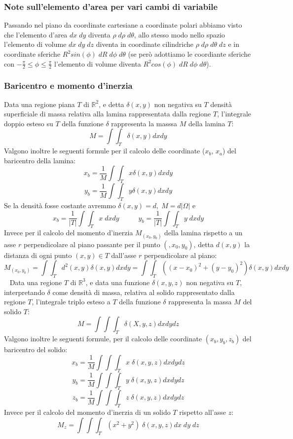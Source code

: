 \subsubsection{Note sull'elemento d'area per vari cambi di variabile}
Passando nel piano da coordinate cartesiane a coordinate polari abbiamo visto che l'elemento d'area $dx \; dy$ diventa $\rho \; d \rho \;d \theta$, allo stesso modo nello spazio l'elemento di volume $dx \; dy \; dz$ diventa in coordinate cilindriche $\rho\; d \rho\; d \theta \; dz$ e in coordinate sferiche $R^2 sin(\phi)\; dR \;d \phi \;d \theta$ (se però adottiamo le coordiante sferiche con $-\frac{\pi}{2} \leq \phi \leq \frac{\pi}{2}$ l'elemento di volume diventa $R^2 cos(\phi) \;dR \;d \phi \;d \theta$).
\subsubsection{Baricentro e momento d'inerzia}
Data una regione piana $T$ di $\mathbb{R}^2$, e detta $\delta (x,y)$ non negativa su $T$ densità superficiale di massa relativa alla lamina rappresentata dalla regione $T$, l'integrale doppio esteso su $T$ della funzione $\delta$ rappresenta la masssa $M$ della lamina $T$:
\[
    M = \int \int_{T} \delta(x,y) dx dy
\]
Valgono inoltre le seguenti formule per il calcolo delle coordinate ($x_b$, $x_a$) del baricentro della lamina:
\[
    x_b = \frac{1}{M}\int \int_{T} x \delta(x,y)dxdy
\]
\[
    y_b= \frac{1}{M} \int \int_{T} y \delta(x,y)dxdy
\]
Se la densità fosse costante avremmo $\delta(x,y) = d, \; M = d|\Omega|$ e 
\[
    x_b = \frac{1}{|T|} \int \int_{T} x \;dxdy \;\;\;\;\;\;\;\;\;\; y_b =\frac{1}{|T|} \int \int_{T} y \;dxdy
\]
Invece per il calcolo del momento d'inerzia $M_{(x_0, y_0)}$ della lamina rispetto a un asse $r$ perpendicolare al piano passante per il punto $(,x_0, y_0)$, detta $d(x,y)$ la distanza di ogni punto $(x,y) \in T$ dall'asse $r$ perpendicolare al piano:
\[
    M_{(x_0, y_0)} =\int \int_{T}d^2(x,y) \delta(x,y) dxdy = \int \int_{T}((x-x_0)^2 + (y-y_0)^2) \delta(x,y) dxdy
\]
\ \newline
\newline
Data una regione $T$ di $\mathbb{R}^3$, e data una funzione $\delta(x,y,z)$ non negativa su $T$, interpretando $\delta$ come densità di massa, relativa al solido rappresentato dalla regione $T$, l'integrale triplo esteso a $T$ della funzione $\delta$ rappresenta la massa $M$ del solido $T$:
\[
    M = \int \int \int_{T} \delta(X,y,z)dx dy dz
\]
Valgono inoltre le seguenti formule, per il calcolo delle coordinate $(x_b, y_b, z_b)$ del baricentro del solido:
\[
    x_b = \frac{1}{M} \int \int \int_{T} x \; \delta(x,y,z) dx dy dz
\]
\[
    y_b = \frac{1}{M} \int \int \int_{T} y \; \delta(x,y,z)dx dy dz
\]
\[
    z_b = \frac{1}{M} \int \int \int_{T} z \; \delta(x,y,z)dx dy dz
\]
Invece per il calcolo del momento d'inerzia di un solido $T$ rispetto all'asse $z$:
\[
    M_z = \int \int \int_{T} (x^2+y^2) \; \delta(x,y,z) dx \; dy \; dz
\]
